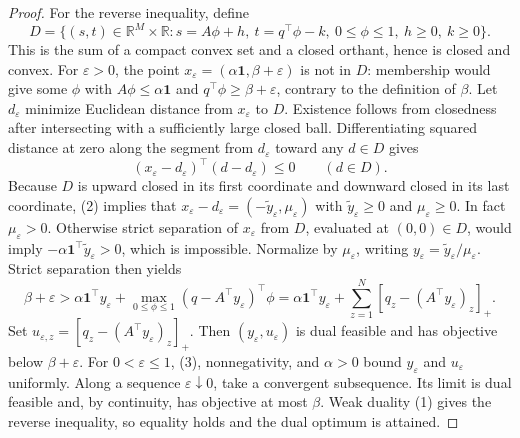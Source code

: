 \documentclass{article}
\begin{document}
\begin{proof}
For the reverse inequality, define
\[
 D=\{(s,t)\in\mathbb R^M\times\mathbb R:s=A\phi+h,\ t=q^\top\phi-k,\ 0\leq\phi\leq1,\ h\geq0,\ k\geq0\}.
\]
This is the sum of a compact convex set and a closed orthant, hence is closed and convex. For \(\varepsilon>0\), the point \(x_\varepsilon=(\alpha\mathbf1,\beta+\varepsilon)\) is not in \(D\): membership would give some \(\phi\) with \(A\phi\leq\alpha\mathbf1\) and \(q^\top\phi\geq\beta+\varepsilon\), contrary to the definition of \(\beta\). Let \(d_\varepsilon\) minimize Euclidean distance from \(x_\varepsilon\) to \(D\). Existence follows from closedness after intersecting with a sufficiently large closed ball. Differentiating squared distance at zero along the segment from \(d_\varepsilon\) toward any \(d\in D\) gives
\[
 (x_\varepsilon-d_\varepsilon)^\top(d-d_\varepsilon)\leq0\qquad(d\in D).\tag{2}
\]
Because \(D\) is upward closed in its first coordinate and downward closed in its last coordinate, (2) implies that \(x_\varepsilon-d_\varepsilon=(-\widetilde y_\varepsilon,\mu_\varepsilon)\) with \(\widetilde y_\varepsilon\geq0\) and \(\mu_\varepsilon\geq0\). In fact \(\mu_\varepsilon>0\). Otherwise strict separation of \(x_\varepsilon\) from \(D\), evaluated at \((0,0)\in D\), would imply \(-\alpha\mathbf1^\top\widetilde y_\varepsilon>0\), which is impossible. Normalize by \(\mu_\varepsilon\), writing \(y_\varepsilon=\widetilde y_\varepsilon/\mu_\varepsilon\). Strict separation then yields
\[
 \beta+\varepsilon>\alpha\mathbf1^\top y_\varepsilon+\max_{0\leq\phi\leq1}(q-A^\top y_\varepsilon)^\top\phi=\alpha\mathbf1^\top y_\varepsilon+\sum_{z=1}^N[q_z-(A^\top y_\varepsilon)_z]_+.\tag{3}
\]
Set \(u_{\varepsilon,z}=[q_z-(A^\top y_\varepsilon)_z]_+\). Then \((y_\varepsilon,u_\varepsilon)\) is dual feasible and has objective below \(\beta+\varepsilon\). For \(0<\varepsilon\leq1\), (3), nonnegativity, and \(\alpha>0\) bound \(y_\varepsilon\) and \(u_\varepsilon\) uniformly. Along a sequence \(\varepsilon\downarrow0\), take a convergent subsequence. Its limit is dual feasible and, by continuity, has objective at most \(\beta\). Weak duality (1) gives the reverse inequality, so equality holds and the dual optimum is attained.
\end{proof}
\end{document}
